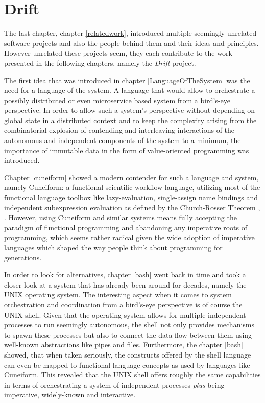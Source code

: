 \section{Drift}
\label{drift}

The last chapter, chapter \ref{relatedwork}, introduced multiple
seemingly unrelated software projects and also the people behind
them and their ideas and principles. However unrelated these projects seem,
they each contribute to the work presented in the following
chapters, namely the \textit{Drift} project.

The first idea that was introduced in chapter \ref{LanguageOfTheSystem}
was the need for a language of the system. A language that would allow
to orchestrate a possibly distributed or even microservice based system
from a bird's-eye perspective. In order to allow such a system's
perspective without depending on global state in a distributed
context and to keep the complexity arising from the combinatorial
explosion of contending and interleaving interactions of the
autonomous and independent components of the system to a minimum,
the importance of immutable data in the form of value-oriented
programming was introduced.

Chapter \ref{cuneiform} showed a modern contender for such a
language and system, namely Cuneiform: a functional scientific
workflow language, utilizing most of the functional language
toolbox like lazy-evaluation, single-assign name bindings and
independent subexpression evaluation as defined by the
Church-Rosser Theorem \cite{churchrosser}, \cite{churchrosserwiki}.
However, using Cuneiform and similar systems means fully accepting
the paradigm of functional programming and abandoning any
imperative roots of programming, which seems rather radical given
the wide adoption of imperative languages which shaped the
way people think about programming for generations.

In order to look for alternatives, chapter \ref{bash} went back
in time and took a closer look at a system that has already been
around for decades, namely the UNIX operating system. The interesting
aspect when it comes to system orchestration and coordination from
a bird's-eye perspective is of course the UNIX shell. Given
that the operating system allows for multiple independent
processes to run seemingly autonomous, the shell not only provides
mechanisms to spawn these processes but also to connect
the data flow between them using well-known abstractions like pipes
and files. Furthermore, the chapter \ref{bash} showed, that when taken
seriously, the constructs offered by the shell language can even
be mapped to functional language concepts as used by languages
like Cuneiform. This revealed that the UNIX shell offers roughly
the same capabilities in terms of orchestrating a system of
independent processes \textit{plus} being imperative, widely-known
and interactive.

